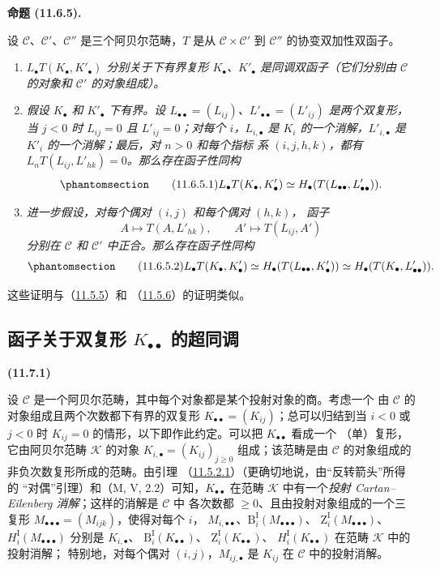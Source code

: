 \documentclass[UTF8,fontset=none,11pt,oneside,openany]{ctexbook}
\newenvironment{env}[1][]{%
  \par\medskip\noindent\textbf{(#1)}\ %
}{\par}
\newenvironment{proposition}[1][]{%
  \par\medskip\noindent\textbf{命题 (#1).}\ %
}{\par}
\let\EGAOriginalLabel\label
\renewcommand{\label}[1]{\phantomsection\EGAOriginalLabel{#1}}
\begin{document}
\begin{proposition}[11.6.5]
\label{0.11.6.5-fr}
设 $\mathcal C$、$\mathcal C'$、$\mathcal C''$ 是三个阿贝尔范畴，$T$ 是从
$\mathcal C\times\mathcal C'$ 到 $\mathcal C''$ 的协变双加性双函子。
\begin{enumerate}
\item[{\rm(i)}] \emph{$L_\bullet T(K_\bullet,K'_\bullet)$ 分别关于下有界复形
$K_\bullet$、$K'_\bullet$ 是同调双函子（它们分别由 $\mathcal C$ 的对象和
$\mathcal C'$ 的对象组成）。}
\item[{\rm(ii)}] \emph{假设 $K_\bullet$ 和 $K'_\bullet$ 下有界。设
$L_{\bullet\bullet}=(L_{ij})$、$L'_{\bullet\bullet}=(L'_{ij})$ 是两个双复形，
当 $j<0$ 时 $L_{ij}=0$ 且 $L'_{ij}=0$；对每个 $i$，$L_{i,\bullet}$ 是 $K_i$
的一个消解，$L'_{i,\bullet}$ 是 $K'_i$ 的一个消解；最后，对 $n>0$ 和每个指标
系 $(i,j,h,k)$，都有 $L_nT(L_{ij},L'_{hk})=0$。那么存在函子性同构}
\[
\label{0.11.6.5.1-fr}
\tag{11.6.5.1}
L_\bullet T(K_\bullet,K'_\bullet)
\simeq H_\bullet(T(L_{\bullet\bullet},L'_{\bullet\bullet})).
\]
\item[{\rm(iii)}] \emph{进一步假设，对每个偶对 $(i,j)$ 和每个偶对 $(h,k)$，
函子
\[
A\longmapsto T(A,L'_{hk}),\qquad
A'\longmapsto T(L_{ij},A')
\]
分别在 $\mathcal C$ 和 $\mathcal C'$ 中正合。那么存在函子性同构}
\[
\label{0.11.6.5.2-fr}
\tag{11.6.5.2}
L_\bullet T(K_\bullet,K'_\bullet)
\simeq H_\bullet(T(L_{\bullet\bullet},K'_\bullet))
\simeq H_\bullet(T(K_\bullet,L'_{\bullet\bullet})).
\]
\end{enumerate}
这些证明与（\hyperref[0.11.5.5-fr]{11.5.5}）和
（\hyperref[0.11.5.6-fr]{11.5.6}）的证明类似。
\end{proposition}

\subsection{函子关于双复形 $K_{\bullet\bullet}$ 的超同调}
\label{subsection:0.11.7-fr}

\begin{env}[11.7.1]
\label{0.11.7.1-fr}
设 $\mathcal C$ 是一个阿贝尔范畴，其中每个对象都是某个投射对象的商。考虑一个
由 $\mathcal C$ 的对象组成且两个次数都下有界的双复形
$K_{\bullet\bullet}=(K_{ij})$；总可以归结到当 $i<0$ 或 $j<0$ 时
$K_{ij}=0$ 的情形，以下即作此约定。可以把 $K_{\bullet\bullet}$ 看成一个
（单）复形，它由阿贝尔范畴 $\mathcal K$ 的对象
$K_{i,\bullet}=(K_{ij})_{j\geq 0}$ 组成；该范畴是由 $\mathcal C$
的对象组成的非负次数复形所成的范畴。由引理
（\hyperref[0.11.5.2.1-fr]{11.5.2.1}）（更确切地说，由“反转箭头”所得的
“对偶”引理）和（M, V, 2.2）可知，$K_{\bullet\bullet}$ 在范畴 $\mathcal K$
中有一个\emph{投射 Cartan--Eilenberg 消解}；这样的消解是 $\mathcal C$ 中
各次数都 $\geq 0$、且由投射对象组成的一个三复形
$M_{\bullet\bullet\bullet}=(M_{ijk})$，使得对每个 $i$，
$M_{i,\bullet\bullet}$、$\mathrm B_i^{\mathrm I}(M_{\bullet\bullet\bullet})$、
$\mathrm Z_i^{\mathrm I}(M_{\bullet\bullet\bullet})$、
$H_i^{\mathrm I}(M_{\bullet\bullet\bullet})$ 分别是 $K_{i,\bullet}$、
$\mathrm B_i^{\mathrm I}(K_{\bullet\bullet})$、
$\mathrm Z_i^{\mathrm I}(K_{\bullet\bullet})$、
$H_i^{\mathrm I}(K_{\bullet\bullet})$ 在范畴 $\mathcal K$ 中的投射消解；
特别地，对每个偶对 $(i,j)$，$M_{ij,\bullet}$ 是 $K_{ij}$ 在 $\mathcal C$
中的投射消解。
\end{env}
\end{document}
